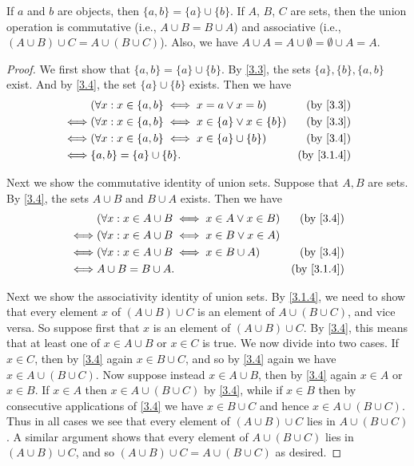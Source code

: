 \begin{lemma}\label{3.1.13}
  If \(a\) and \(b\) are objects, then \(\{a, b\} = \{a\} \cup \{b\}\).
  If \(A\), \(B\), \(C\) are sets, then the union operation is commutative (i.e., \(A \cup B = B \cup A\)) and associative (i.e., \((A \cup B) \cup C = A \cup (B \cup C)\)).
  Also, we have \(A \cup A = A \cup \emptyset = \emptyset \cup A = A\).
\end{lemma}

\begin{proof}
  We first show that \(\{a, b\} = \{a\} \cup \{b\}\).
  By \cref{3.3}, the sets \(\{a\}, \{b\}, \{a, b\}\) exist.
  And by \cref{3.4}, the set \(\{a\} \cup \{b\}\) exists.
  Then we have
  \begin{align*}
         & (\forall x : x \in \{a, b\} \iff x = a \lor x = b)             & \text{(by \cref{3.3})}   \\
    \iff & (\forall x : x \in \{a, b\} \iff x \in \{a\} \lor x \in \{b\}) & \text{(by \cref{3.3})}   \\
    \iff & (\forall x : x \in \{a, b\} \iff x \in \{a\} \cup \{b\})       & \text{(by \cref{3.4})}   \\
    \iff & \{a, b\} = \{a\} \cup \{b\}.                                   & \text{(by \cref{3.1.4})}
  \end{align*}

  Next we show the commutative identity of union sets.
  Suppose that \(A, B\) are sets.
  By \cref{3.4}, the sets \(A \cup B\) and \(B \cup A\) exists.
  Then we have
  \begin{align*}
         & (\forall x : x \in A \cup B \iff x \in A \lor x \in B) & \text{(by \cref{3.4})}   \\
    \iff & (\forall x : x \in A \cup B \iff x \in B \lor x \in A)                            \\
    \iff & (\forall x : x \in A \cup B \iff x \in B \cup A)       & \text{(by \cref{3.4})}   \\
    \iff & A \cup B = B \cup A.                                   & \text{(by \cref{3.1.4})}
  \end{align*}

  Next we show the associativity identity of union sets.
  By \cref{3.1.4}, we need to show that every element \(x\) of \((A \cup B) \cup C\) is an element of \(A \cup (B \cup C)\), and vice versa.
  So suppose first that \(x\) is an element of \((A \cup B) \cup C\).
  By \cref{3.4}, this means that at least one of \(x \in A \cup B\) or \(x \in C\) is true.
  We now divide into two cases.
  If \(x \in C\), then by \cref{3.4} again \(x \in B \cup C\), and so by \cref{3.4} again we have \(x \in A \cup (B \cup C)\).
  Now suppose instead \(x \in A \cup B\), then by \cref{3.4} again \(x \in A\) or \(x \in B\).
  If \(x \in A\) then \(x \in A \cup (B \cup C)\) by \cref{3.4}, while if \(x \in B\) then by consecutive applications of \cref{3.4} we have \(x \in B \cup C\) and hence \(x \in A \cup (B \cup C)\).
  Thus in all cases we see that every element of \((A \cup B) \cup C\) lies in \(A \cup (B \cup C)\).
  A similar argument shows that every element of \(A \cup (B \cup C)\) lies in \((A \cup B) \cup C\), and so \((A \cup B) \cup C = A \cup (B \cup C) \) as desired.


\end{proof}
